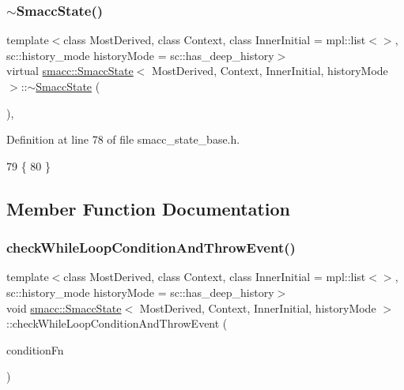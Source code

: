 \subsubsection{\texorpdfstring{$\sim$\+Smacc\+State()}{~SmaccState()}}
{\footnotesize\ttfamily template$<$class Most\+Derived, class Context, class Inner\+Initial = mpl\+::list$<$$>$, sc\+::history\+\_\+mode history\+Mode = sc\+::has\+\_\+deep\+\_\+history$>$ \\
virtual \hyperlink{classsmacc_1_1SmaccState}{smacc\+::\+Smacc\+State}$<$ Most\+Derived, Context, Inner\+Initial, history\+Mode $>$\+::$\sim$\hyperlink{classsmacc_1_1SmaccState}{Smacc\+State} (\begin{DoxyParamCaption}{ }\end{DoxyParamCaption})\hspace{0.3cm}{\ttfamily [inline]}, {\ttfamily [virtual]}}



Definition at line 78 of file smacc\+\_\+state\+\_\+base.\+h.


\begin{DoxyCode}
79     \{
80     \}
\end{DoxyCode}


\subsection{Member Function Documentation}
\mbox{\label{classsmacc_1_1SmaccState_a80082718f226bebedb589f0c4696001d}} 
\subsubsection{\texorpdfstring{check\+While\+Loop\+Condition\+And\+Throw\+Event()}{checkWhileLoopConditionAndThrowEvent()}}
{\footnotesize\ttfamily template$<$class Most\+Derived, class Context, class Inner\+Initial = mpl\+::list$<$$>$, sc\+::history\+\_\+mode history\+Mode = sc\+::has\+\_\+deep\+\_\+history$>$ \\
void \hyperlink{classsmacc_1_1SmaccState}{smacc\+::\+Smacc\+State}$<$ Most\+Derived, Context, Inner\+Initial, history\+Mode $>$\+::check\+While\+Loop\+Condition\+And\+Throw\+Event (\begin{DoxyParamCaption}\item[{\hyperlink{classbool}{bool}(Most\+Derived\+::$\ast$)()}]{condition\+Fn }\end{DoxyParamCaption})\hspace{0.3cm}{\ttfamily [inline]}}



